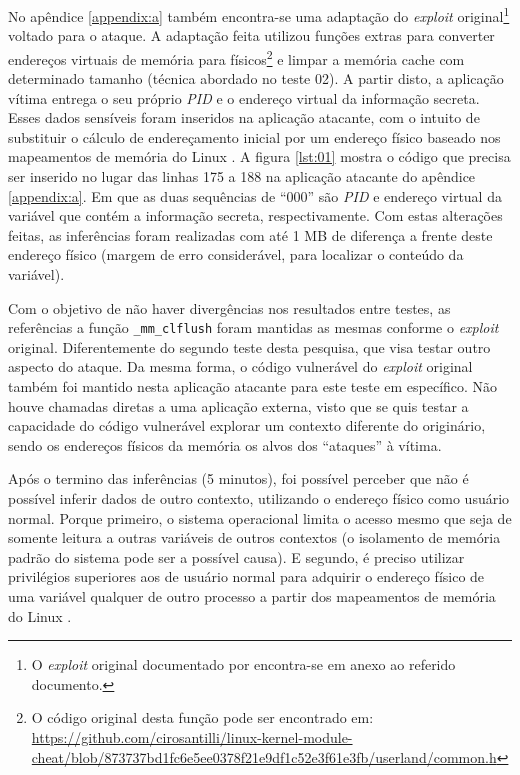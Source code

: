 \documentclass[conference]{IEEEtran}
\begin{document}
No apêndice \ref{appendix:a} também encontra-se uma adaptação do \emph{exploit} original\footnote{O \emph{exploit} original documentado por  encontra-se em anexo ao referido documento.} voltado para o ataque. A adaptação feita utilizou funções extras para converter endereços virtuais de memória para físicos\footnote{O código original desta função pode ser encontrado em: \url{https://github.com/cirosantilli/linux-kernel-module-cheat/blob/873737bd1fc6e5ee0378f21e9df1c52e3f61e3fb/userland/common.h}} e limpar a memória cache com determinado tamanho (técnica abordado no teste 02). A partir disto, a aplicação vítima entrega o seu próprio \emph{PID} e o endereço virtual da informação secreta. Esses dados sensíveis foram inseridos na aplicação atacante, com o intuito de substituir o cálculo de endereçamento inicial por um endereço físico baseado nos mapeamentos de memória do Linux \cite{EQWARE2009Capturing}. A figura \ref{lst:01} mostra o código que precisa ser inserido no lugar das linhas 175 a 188 na aplicação atacante do apêndice \ref{appendix:a}. Em que as duas sequências de ``000'' são \emph{PID} e endereço virtual da variável que contém a informação secreta, respectivamente. Com estas alterações feitas, as inferências foram realizadas com até 1 MB de diferença a frente deste endereço físico (margem de erro considerável, para localizar o conteúdo da variável).

Com o objetivo de não haver divergências nos resultados entre testes, as referências a função \lstinline[language=C, style=c]{_mm_clflush} foram mantidas as mesmas conforme o \emph{exploit} original. Diferentemente do segundo teste desta pesquisa, que visa testar outro aspecto do ataque. Da mesma forma, o código vulnerável do \emph{exploit} original também foi mantido nesta aplicação atacante para este teste em específico. Não houve chamadas diretas a uma aplicação externa, visto que se quis testar a capacidade do código vulnerável explorar um contexto diferente do originário, sendo os endereços físicos da memória os alvos dos ``ataques'' à vítima.



Após o termino das inferências (5 minutos), foi possível perceber que não é possível inferir dados de outro contexto, utilizando o endereço físico como usuário normal. Porque primeiro, o sistema operacional limita o acesso mesmo que seja de somente leitura a outras variáveis de outros contextos (o isolamento de memória padrão do sistema pode ser a possível causa). E segundo, é preciso utilizar privilégios superiores aos de usuário normal para adquirir o endereço físico de uma variável qualquer de outro processo a partir dos mapeamentos de memória do Linux \cite{EQWARE2009Capturing}.
\end{document}
